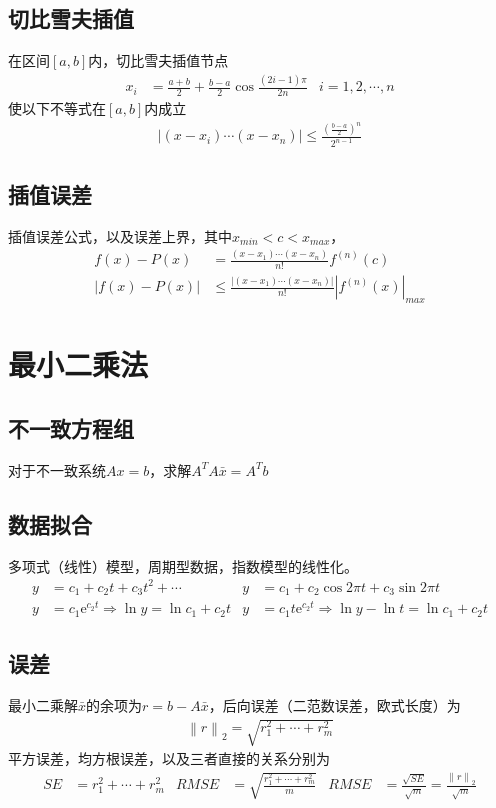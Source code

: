 \documentclass[twocolumn]{article}
\begin{document}
\subsection{切比雪夫插值}
在区间$[a,b]$内，切比雪夫插值节点
\begin{align*}
    x_i & =\frac{a+b}{2}+\frac{b-a}{2}\cos{\frac{(2i-1)\pi}{2n}} & i=1,2,\cdots,n
\end{align*}
使以下不等式在$[a,b]$内成立
\begin{align*}
    \left| (x-x_i)\cdots(x-x_n) \right|\leqslant \frac{\left( \frac{b-a}{2} \right)^n}{2^{n-1}}
\end{align*}

\subsection{插值误差}
插值误差公式，以及误差上界，其中$x_{min}<c<x_{max}$，
\begin{align*}
    f(x)-P(x)                & =\frac{(x-x_1)\cdots(x-x_n)}{n!}f^{(n)}(c)                                             \\
    \left| f(x)-P(x) \right| & \leqslant\frac{\left| (x-x_1)\cdots(x-x_n) \right|}{n!}\left| f^{(n)}(x) \right|_{max}
\end{align*}

\section{最小二乘法}

\subsection{不一致方程组}
对于不一致系统$Ax=b$，求解$A^TA\bar{x}=A^Tb$

\subsection{数据拟合}
多项式（线性）模型，周期型数据，指数模型的线性化。
\begin{align*}
    y & =c_1+c_2t+c_3t^2+\cdots                                & y & =c_1+c_2\cos{2\pi t}+c_3\sin{2\pi t}                           \\
    y & =c_1\mathrm{e}^{c_2t} \Rightarrow \ln{y}=\ln{c_1}+c_2t & y & =c_1t\mathrm{e}^{c_2t} \Rightarrow \ln{y}-\ln{t}=\ln{c_1}+c_2t
\end{align*}

\subsection{误差}
最小二乘解$\bar{x}$的余项为$r=b-A\bar{x}$，后向误差（二范数误差，欧式长度）为
\begin{align*}
    \left\| r \right\|_2=\sqrt{r_1^2+\cdots+r_m^2}
\end{align*}
平方误差，均方根误差，以及三者直接的关系分别为
\begin{align*}
    SE & =r_1^2+\cdots+r_m^2 & RMSE & =\sqrt{\frac{r_1^2+\cdots+r_m^2}{m}} & RMSE & =\frac{\sqrt{SE}}{\sqrt{m}}=\frac{\left\| r \right\|_2}{\sqrt{m}}
\end{align*}
\end{document}
